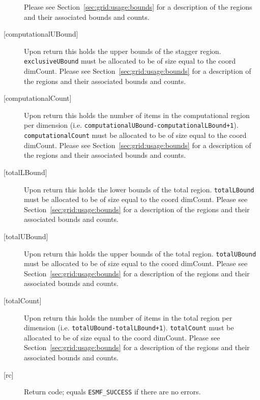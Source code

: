 \begin{description}
            Please see Section~\ref{sec:grid:usage:bounds} for a description
            of the regions and their associated bounds and counts.
       \item[{[computationalUBound]}]
            Upon return this holds the upper bounds of the stagger region.
            {\tt exclusiveUBound} must be allocated to be of size equal to the coord dimCount.
            Please see Section~\ref{sec:grid:usage:bounds} for a description
            of the regions and their associated bounds and counts.
       \item[{[computationalCount]}]
            Upon return this holds the number of items in the computational region per dimension
            (i.e. {\tt computationalUBound-computationalLBound+1}). {\tt computationalCount}
            must be allocated to be of size equal to the coord dimCount.
            Please see Section~\ref{sec:grid:usage:bounds} for a description
            of the regions and their associated bounds and counts.
       \item[{[totalLBound]}]
            Upon return this holds the lower bounds of the total region.
            {\tt totalLBound} must be allocated to be of size equal to the coord dimCount.
            Please see Section~\ref{sec:grid:usage:bounds} for a description
            of the regions and their associated bounds and counts.
       \item[{[totalUBound]}]
            Upon return this holds the upper bounds of the total region.
            {\tt totalUBound} must be allocated to be of size equal to the coord dimCount.
            Please see Section~\ref{sec:grid:usage:bounds} for a description
            of the regions and their associated bounds and counts.
       \item[{[totalCount]}]
            \begin{sloppypar}
            Upon return this holds the number of items in the total region per dimension
            (i.e. {\tt totalUBound-totalLBound+1}). {\tt totalCount} must
            be allocated to be of size equal to the coord dimCount.
            Please see Section~\ref{sec:grid:usage:bounds} for a description
            of the regions and their associated bounds and counts.
            \end{sloppypar}
       \item[{[rc]}]
            Return code; equals {\tt ESMF\_SUCCESS} if there are no errors.
     \end{description}
   
